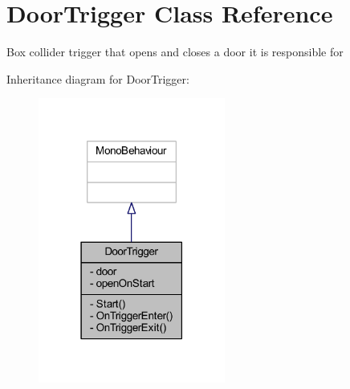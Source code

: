 \hypertarget{class_door_trigger}{}\section{Door\+Trigger Class Reference}
\label{class_door_trigger}


Box collider trigger that opens and closes a door it is responsible for  




Inheritance diagram for Door\+Trigger\+:
\nopagebreak
\begin{figure}[H]
\begin{center}
\leavevmode
\includegraphics[width=174pt]{class_door_trigger__inherit__graph}
\end{center}
\end{figure}


